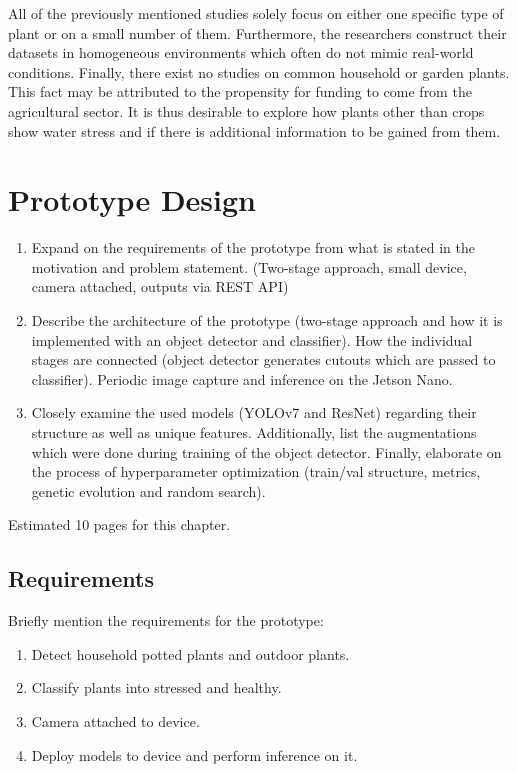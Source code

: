 \documentclass[draft,final]{vutinfth} %
\begin{document}
All of the previously mentioned studies solely focus on either one
specific type of plant or on a small number of them. Furthermore, the
researchers construct their datasets in homogeneous environments which
often do not mimic real-world conditions. Finally, there exist no
studies on common household or garden plants. This fact may be
attributed to the propensity for funding to come from the agricultural
sector. It is thus desirable to explore how plants other than crops
show water stress and if there is additional information to be gained
from them.

\chapter{Prototype Design}
\label{chap:design}

\begin{enumerate}
\item Expand on the requirements of the prototype from what is stated
  in the motivation and problem statement. (Two-stage approach, small
  device, camera attached, outputs via REST API)
\item Describe the architecture of the prototype (two-stage approach
  and how it is implemented with an object detector and
  classifier). How the individual stages are connected (object
  detector generates cutouts which are passed to classifier). Periodic
  image capture and inference on the Jetson Nano.
\item Closely examine the used models (YOLOv7 and ResNet) regarding
  their structure as well as unique features. Additionally, list the
  augmentations which were done during training of the object
  detector. Finally, elaborate on the process of hyperparameter
  optimization (train/val structure, metrics, genetic evolution and
  random search).
\end{enumerate}

Estimated 10 pages for this chapter.

\section{Requirements}
\label{sec:requirements}

Briefly mention the requirements for the prototype:

\begin{enumerate}
\item Detect household potted plants and outdoor plants.
\item Classify plants into stressed and healthy.
\item Camera attached to device.
\item Deploy models to device and perform inference on it.
\end{enumerate}
\end{document}
